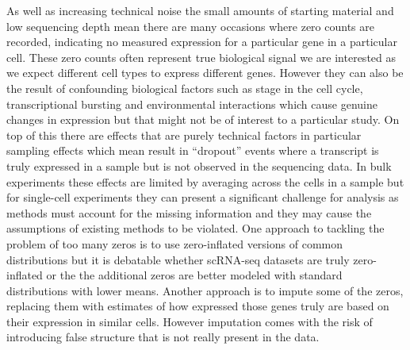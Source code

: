 \documentclass[11pt,a4paper,titlepage,twoside,openright]{style/unimelbthesis}
\theoremstyle{definition}
\theoremstyle{definition}
\theoremstyle{definition}
\theoremstyle{remark}
\begin{document}
\begin{mainmatter}
As well as increasing technical noise the small amounts of starting material and low sequencing depth mean there are many occasions where zero counts are recorded, indicating no measured expression for a particular gene in a particular cell. These zero counts often represent true biological signal we are interested as we expect different cell types to express different genes. However they can also be the result of confounding biological factors such as stage in the cell cycle, transcriptional bursting and environmental interactions which cause genuine changes in expression but that might not be of interest to a particular study. On top of this there are effects that are purely technical factors in particular sampling effects which mean result in ``dropout'' events where a transcript is truly expressed in a sample but is not observed in the sequencing data. In bulk experiments these effects are limited by averaging across the cells in a sample but for single-cell experiments they can present a significant challenge for analysis as methods must account for the missing information and they may cause the assumptions of existing methods to be violated. One approach to tackling the problem of too many zeros is to use zero-inflated versions of common distributions but it is debatable whether scRNA-seq datasets are truly zero-inflated or the the additional zeros are better modeled with standard distributions with lower means. Another approach is to impute some of the zeros, replacing them with estimates of how expressed those genes truly are based on their expression in similar cells. However imputation comes with the risk of introducing false structure that is not really present in the data.


\end{mainmatter}
\end{document}
